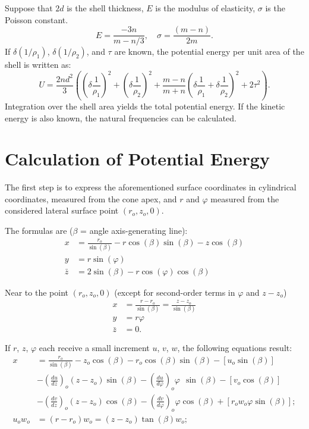 \documentclass{amsart}
\begin{document}
Suppose that \(2d\) is the shell thickness, \(E\) is the
modulus of elasticity, \(\sigma\) is the Poisson constant.
\[
E = \frac{-3n}{m - n/3}, \quad \sigma = \frac{(m - n)}{2m}.
\]
If \(\delta (1/\rho_1)\), \(\delta (1/\rho_2)\), and
\(\tau\) are known, the potential energy per unit area
of the shell is written as:
\begin{equation} \label{eq1}
U = \frac{2n d^2}{3} \left(
\left( \delta \frac{1}{\rho_1} \right)^2 +
\left( \delta \frac{1}{\rho_2} \right)^2 +
\frac{m-n}{m+n} \left(\delta \frac{1}{\rho_1} +
\delta \frac{1}{\rho_2}\right)^2 + 2 \tau^2 \right).
\end{equation}
Integration over the shell area yields the total
potential energy.  If the kinetic energy is also known,
the natural frequencies can be calculated.

\section{Calculation of Potential Energy}

The first step is to express the aforementioned surface
coordinates in cylindrical coordinates, measured from the cone apex, and \(r\)
and \(\varphi\) measured from the considered lateral surface point \( (r_o,z_o, 0)\).

The formulas are (\(\beta \) = angle axis-generating line):
\begin{align}
x &= \frac{r_o}{\sin(\beta)} - r \cos(\beta) \sin(\beta) - z \cos(\beta) \nonumber \\
y &= r \sin(\varphi) \label{eq2} \\
\bar{z} &= 2 \sin(\beta ) - r \cos(\varphi) \cos(\beta) \nonumber
\end{align}

Near to the point \((r_o,z_o, 0)\) (except for
second-order terms in \(\varphi\) and \(z-z_o\))
\begin{align*}
x&= \frac{r-r_o}{\sin(\beta)}=
\frac{z-z_o}{\sin(\beta)} \\
y &= r \varphi \tag{2a} \\
\bar{z} & = 0.
\end{align*}

If \(r\), \(z\), \(\varphi\) each receive a small
increment \(u\), \(v\), \(w\), the following equations result:
\begin{align}
x &= \frac{r_o}{\sin(\beta)} -z_o \cos(\beta)
-r_o\cos(\beta)\sin(\beta) -[u_o\sin(\beta)] \nonumber \\
& -\left(\frac{d u}{dz}\right)_o (z-z_o) \sin(\beta) -
\left(\frac{d u}{d\varphi}\right)_o
\varphi ~~ \sin(\beta) -[v_o\cos(\beta)] \\
& -\left(\frac{d v}{dz}\right)_o (z-z_o)\cos(\beta) -
\left(\frac{d v}{d \varphi}\right)_o
\varphi \cos(\beta) + [r_o w_o \varphi \sin(\beta)]; \nonumber \\
u_o w_o &=(r-r_o)w_o = (z-z_o)\tan(\beta)w_o; \nonumber
\end{align}
\end{document}
